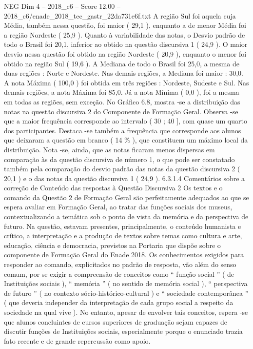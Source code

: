 \begin{textsample}{NEG Dim 4 – 2018\_c6 – Score 12.00 – 2018\_c6/enade\_2018\_tec\_gastr\_22da731e6f.txt}
A região Sul foi aquela cuja Média, também nessa questão, foi maior ( 29,1 ), enquanto a de menor Média foi a região Nordeste ( 25,9 ).
Quanto à variabilidade das notas, o Desvio padrão de todo o Brasil foi 20,1, inferior ao obtido na questão discursiva 1 ( 24,9 ).
O maior desvio nessa questão foi obtido na região Nordeste ( 20,9 ), enquanto o menor foi obtido na região Sul ( 19,6 ).
A Mediana de todo o Brasil foi 25,0, a mesma de duas regiões : Norte e Nordeste.
Nas demais regiões, a Mediana foi maior : 30,0.
A nota Máxima ( 100,0 ) foi obtida em três regiões : Nordeste, Sudeste e Sul.
Nas demais regiões, a nota Máxima foi 85,0.
Já a nota Mínima ( 0,0 ), foi a mesma em todas as regiões, sem exceção.
No Gráfico 6.8, mostra -se a distribuição das notas na questão discursiva 2 do Componente de Formação Geral.
Observa -se que a maior frequência corresponde ao intervalo ( 30 ; 40 ], com quase um quarto dos participantes.
Destaca -se também a frequência que corresponde aos alunos que deixaram a questão em branco ( 14 \% ), que constituem um máximo local da distribuição.
Nota -se, ainda, que as notas ficaram menos dispersas em comparação às da questão discursiva de número 1, o que pode ser constatado também pela comparação do desvio padrão das notas da questão discursiva 2 ( 20,1 ) e o das notas da questão discursiva 1 ( 24,9 ). 6.3.1.4 Comentários sobre a correção de Conteúdo das respostas à Questão Discursiva 2 Os textos e o comando da Questão 2 de Formação Geral são perfeitamente adequados ao que se espera avaliar em Formação Geral, ao tratar das funções sociais dos museus, contextualizando a temática sob o ponto de vista da memória e da perspectiva de futuro.
Na questão, estavam presentes, principalmente, o conteúdo humanista e crítico, a interpretação e a produção de textos sobre temas como cultura e arte, educação, ciência e democracia, previstos na Portaria que dispõe sobre o componente de Formação Geral do Enade 2018.
Os conhecimentos exigidos para responder ao comando, explicitados no padrão de resposta, vão além do senso comum, por se exigir a compreensão de conceitos como “ função social ” ( de Instituições sociais ), “ memória ” ( no sentido de memória social ), “ perspectiva de futuro ” ( no contexto sócio-histórico-cultural ) e “ sociedade contemporânea ” ( que deveria independer da interpretação de cada grupo social a respeito da sociedade na qual vive ).
No entanto, apesar de envolver tais conceitos, espera -se que alunos concluintes de cursos superiores de graduação sejam capazes de discutir funções de Instituições sociais, especialmente porque o enunciado trazia fato recente e de grande repercussão como apoio.

\end{textsample}
